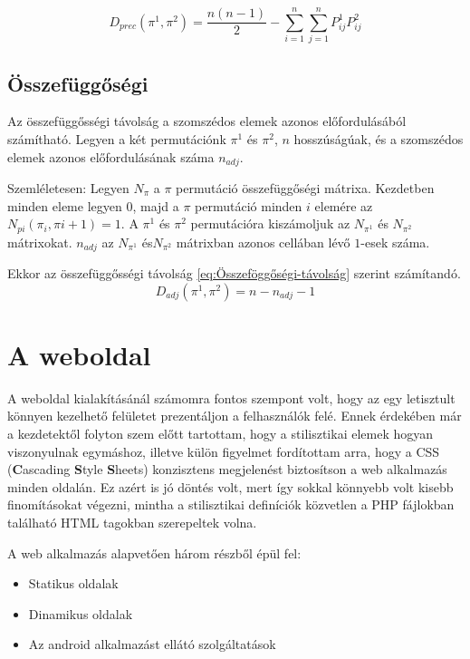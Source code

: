 \documentclass[12pt]{report}
\theoremstyle{definition}
\begin{document}
	\begin{equation} \label{eq:Precedencia-távolság}
	D_{prec}\left(\pi^1, \pi^2\right)=\dfrac{n\left(n-1\right)}{2}-\sum_{i=1}^{n}\sum_{j=1}^{n}P_{ij}^1P_{ij}^2
	\end{equation}
	
	\section{Összefüggőségi}
	Az összefüggősségi távolság a szomszédos elemek azonos előfordulásából számítható. Legyen a két permutációnk $\pi^1$ és $\pi^2$, $n$ hosszúságúak, és a szomszédos elemek azonos előfordulásának száma $n_{adj}$.
	
	Szemléletesen: Legyen $N_{\pi}$ a $\pi$ permutáció összefüggőségi mátrixa. Kezdetben minden eleme legyen $0$, majd a $\pi$ permutáció minden $i$ elemére az $N_{pi}\left(\pi_{i},\pi{i+1}\right)=1$. A $\pi^1$ és $\pi^2$ permutációra kiszámoljuk az $N_{\pi^1}$ és $N_{\pi^2}$ mátrixokat. $n_{adj}$ az $N_{\pi^1}$
	és$N_{\pi^2}$ mátrixban azonos cellában lévő $1$-esek száma. 
	
	Ekkor az összefüggősségi távolság \ref{eq:Összeföggőségi-távolság} szerint számítandó.
	\begin{equation} \label{eq:Összeföggőségi-távolság}
	D_{adj}\left(\pi^1,\pi^2\right)=n-n_{adj}-1
	\end{equation}
	\cite{Borkostolas projekt}
	
	\chapter{A weboldal}
	
	A weboldal kialakításánál számomra fontos szempont volt, hogy az egy letisztult könnyen kezelhető felületet prezentáljon a felhasználók felé. Ennek érdekében már a kezdetektől folyton szem előtt tartottam, hogy a stilisztikai elemek hogyan viszonyulnak egymáshoz, illetve külön figyelmet fordítottam arra, hogy a CSS (\textbf{C}ascading \textbf{S}tyle \textbf{S}heets) konzisztens megjelenést biztosítson a web alkalmazás minden oldalán. Ez azért is jó döntés volt, mert így sokkal könnyebb volt kisebb finomításokat végezni, mintha a stilisztikai definíciók közvetlen a PHP fájlokban található HTML tagokban szerepeltek volna.
	
	A web alkalmazás alapvetően három részből épül fel:
	
	\begin{itemize}
		\item Statikus oldalak
		\item Dinamikus oldalak
		\item Az android alkalmazást ellátó szolgáltatások
	\end{itemize}
	
\end{document}
